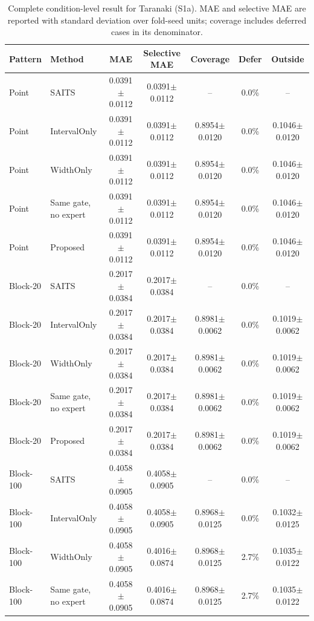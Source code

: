 \begin{table}
\caption{Complete condition-level result for Taranaki (S1a).
MAE and selective MAE are reported with standard deviation over fold-seed units;
coverage includes deferred cases in its denominator.}
\label{tab:s1a}
\centering
\scriptsize
\setlength{\tabcolsep}{4pt}
\begin{tabular*}{\textwidth}{@{\extracolsep{\fill}}llccccc@{}}
\toprule
Pattern & Method & MAE & Selective MAE & Coverage & Defer & Outside \\
\midrule
Point & SAITS & 0.0391$\pm$0.0112 & 0.0391$\pm$0.0112 & -- & 0.0\% & -- \\
Point & IntervalOnly & 0.0391$\pm$0.0112 & 0.0391$\pm$0.0112 & 0.8954$\pm$0.0120 & 0.0\% & 0.1046$\pm$0.0120 \\
Point & WidthOnly & 0.0391$\pm$0.0112 & 0.0391$\pm$0.0112 & 0.8954$\pm$0.0120 & 0.0\% & 0.1046$\pm$0.0120 \\
Point & Same gate, no expert & 0.0391$\pm$0.0112 & 0.0391$\pm$0.0112 & 0.8954$\pm$0.0120 & 0.0\% & 0.1046$\pm$0.0120 \\
Point & Proposed & 0.0391$\pm$0.0112 & 0.0391$\pm$0.0112 & 0.8954$\pm$0.0120 & 0.0\% & 0.1046$\pm$0.0120 \\
\addlinespace[1.5pt]
Block-20 & SAITS & 0.2017$\pm$0.0384 & 0.2017$\pm$0.0384 & -- & 0.0\% & -- \\
Block-20 & IntervalOnly & 0.2017$\pm$0.0384 & 0.2017$\pm$0.0384 & 0.8981$\pm$0.0062 & 0.0\% & 0.1019$\pm$0.0062 \\
Block-20 & WidthOnly & 0.2017$\pm$0.0384 & 0.2017$\pm$0.0384 & 0.8981$\pm$0.0062 & 0.0\% & 0.1019$\pm$0.0062 \\
Block-20 & Same gate, no expert & 0.2017$\pm$0.0384 & 0.2017$\pm$0.0384 & 0.8981$\pm$0.0062 & 0.0\% & 0.1019$\pm$0.0062 \\
Block-20 & Proposed & 0.2017$\pm$0.0384 & 0.2017$\pm$0.0384 & 0.8981$\pm$0.0062 & 0.0\% & 0.1019$\pm$0.0062 \\
\addlinespace[1.5pt]
Block-100 & SAITS & 0.4058$\pm$0.0905 & 0.4058$\pm$0.0905 & -- & 0.0\% & -- \\
Block-100 & IntervalOnly & 0.4058$\pm$0.0905 & 0.4058$\pm$0.0905 & 0.8968$\pm$0.0125 & 0.0\% & 0.1032$\pm$0.0125 \\
Block-100 & WidthOnly & 0.4058$\pm$0.0905 & 0.4016$\pm$0.0874 & 0.8968$\pm$0.0125 & 2.7\% & 0.1035$\pm$0.0122 \\
Block-100 & Same gate, no expert & 0.4058$\pm$0.0905 & 0.4016$\pm$0.0874 & 0.8968$\pm$0.0125 & 2.7\% & 0.1035$\pm$0.0122 \\

\end{tabular*}
\end{table}

